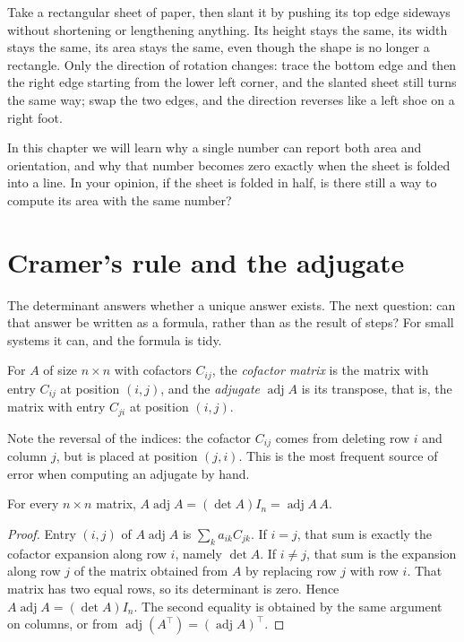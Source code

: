 \begin{untukanak}
Take a rectangular sheet of paper, then slant it by pushing its top edge sideways without
shortening or lengthening anything. Its height stays the same, its width stays the same, its
area stays the same, even though the shape is no longer a rectangle. Only the direction of
rotation changes: trace the bottom edge and then the right edge starting from the lower left
corner, and the slanted sheet still turns the same way; swap the two edges, and the direction
reverses like a left shoe on a right foot.

In this chapter we will learn why a single number can report both area and orientation, and why
that number becomes zero exactly when the sheet is folded into a line. In your opinion, if the
sheet is folded in half, is there still a way to compute its area with the same number?
\end{untukanak}

\section{Cramer's rule and the adjugate}

The determinant answers whether a unique answer exists. The next question: can that answer be
written as a formula, rather than as the result of steps? For small systems it can, and the
formula is tidy.


\begin{definisi}[Adjugate]
For $A$ of size $n\times n$ with cofactors $C_{ij}$, the \emph{cofactor matrix} is the matrix
with entry $C_{ij}$ at position $(i,j)$, and the \emph{adjugate} $\operatorname{adj}A$ is its
transpose, that is, the matrix with entry $C_{ji}$ at position $(i,j)$.
\end{definisi}

Note the reversal of the indices: the cofactor $C_{ij}$ comes from deleting row $i$ and column
$j$, but is placed at position $(j,i)$. This is the most frequent source of error when
computing an adjugate by hand.

\begin{teorema}
For every $n\times n$ matrix, $A\operatorname{adj}A
=(\det A)I_{n}=\operatorname{adj}A\,A$.
\end{teorema}

\begin{proof}
Entry $(i,j)$ of $A\operatorname{adj}A$ is $\sum_{k}a_{ik}C_{jk}$. If $i=j$, that sum is exactly
the cofactor expansion along row $i$, namely $\det A$. If $i\neq j$, that sum is the expansion
along row $j$ of the matrix obtained from $A$ by replacing row $j$ with row $i$. That matrix has
two equal rows, so its determinant is zero. Hence $A\operatorname{adj}A=(\det A)I_{n}$. The
second equality is obtained by the same argument on columns, or from
$\operatorname{adj}(A^{\top})=(\operatorname{adj}A)^{\top}$.
\end{proof}

